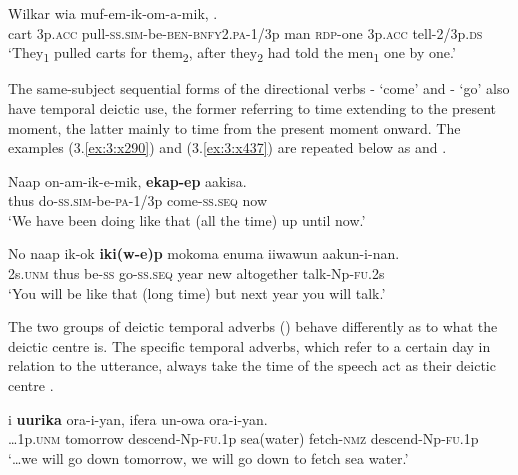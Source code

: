 \ea%
\label{ex:6:x1268}
\gll Wilkar  wia  muf-em-ik-om-a-mik,       .\\
cart  3p.\textsc{acc}  pull-\textsc{ss}.\textsc{sim}-be-\textsc{ben}-\textsc{bnfy}2.\textsc{pa}-1/3p  man \textsc{rdp}-one  3p.\textsc{acc}  tell-2/3p.\textsc{ds} \\
\glt `They\textsubscript{1} pulled carts for them\textsubscript{2}, after they\textsubscript{2} had told the men\textsubscript{1} one by one.'
\z

The same-subject sequential forms of the directional verbs - `come' and - `go' also have temporal deictic use, the former referring to time extending to the present moment, the latter mainly to time from the present moment onward. The examples (3.\ref{ex:3:x290}) and (3.\ref{ex:3:x437}) 
are repeated below as  and .

\ea%
\label{ex:6:x1941}
\gll Naap  on-am-ik-e-mik,  \textbf{ekap-ep} aakisa. \\
thus  do-\textsc{ss}.\textsc{sim}-be-\textsc{pa}-1/3p  come-\textsc{ss}.\textsc{seq}  now\\
\glt `We have been doing like that (all the time) up until now.'
\z

\ea%
\label{ex:6:x1942}
\gll No  naap  ik-ok  \textbf{iki(w-e)p}  mokoma  enuma  iiwawun aakun-i-nan.\\
2s.\textsc{unm}  thus  be-\textsc{ss}  go-\textsc{ss}.\textsc{seq}  year  new  altogether talk-Np-\textsc{fu}.2s\\
\glt `You will be like that (long time) but next year you will talk.'
\z

The two groups of deictic temporal adverbs () behave differently as to what the deictic centre is. The specific temporal adverbs, which refer to a certain day in relation to the utterance, always take the time of the speech act as their deictic centre . 

\ea%
\label{ex:6:x1889}
\gll {\dots}i  \textbf{uurika}  ora-i-yan,  ifera  un-owa ora-i-yan.\\
{\dots}1p.\textsc{unm}  tomorrow  descend-Np-\textsc{fu}.1p  sea(water)  fetch-\textsc{nmz} descend-Np-\textsc{fu}.1p\\
\glt `{\dots}we will go down tomorrow, we will go down to fetch sea water.'
\z

